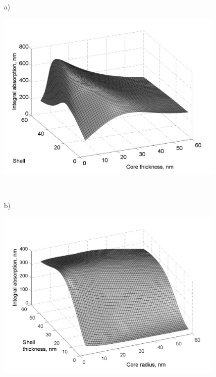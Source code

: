 \documentclass[aip,jap,reprint]{revtex4-1}
\begin{document}
\begin{figure}[!h]
  \begin{minipage}[h]{0.47\textwidth}
    \begin{flushleft}
      a)
    \end{flushleft}
  \end{minipage}
  \begin{minipage}[h]{0.47\textwidth}
    \includegraphics[width=0.99\textwidth]{Cint_TiO_Ag}
  \end{minipage}\\
  \vspace{4pt}
  \begin{minipage}[h]{0.47\textwidth}
    \begin{flushleft}
      b)
    \end{flushleft}
  \end{minipage}
  \begin{minipage}[h]{0.47\textwidth}
    \includegraphics[width=0.99\textwidth]{Cint_Ag_TiO}

\end{minipage}
\end{figure}
\end{document}
